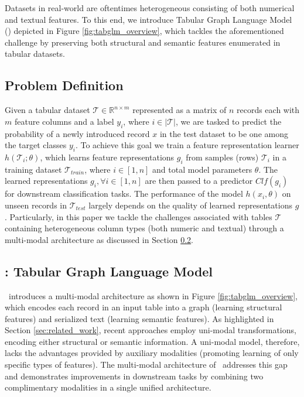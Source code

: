 Datasets in real-world are oftentimes heterogeneous consisting of both numerical and textual features. To this end, we introduce Tabular Graph Language Model (\tabglm) depicted in Figure \ref{fig:tabglm_overview}, which tackles the aforementioned challenge by preserving both structural and semantic features enumerated in tabular datasets.

\subsection{Problem Definition}
\label{sec:problem_definition}
Given a tabular dataset $\mathcal{T} \in \mathbb{R}^{n \times m}$ represented as a matrix of $n$ records each with $m$ feature columns and a label $y_i$, where $i \in |\mathcal{T}|$, we are tasked to predict the probability of a newly introduced record $x$ in the test dataset to be one among the target classes $y_i$.
To achieve this goal we train a feature representation learner $h(\mathcal{T}_i; \theta)$, which learns feature representations $g_i$ from samples (rows) $\mathcal{T}_i$ in a training dataset $\mathcal{T}_{train}$, where $i \in [1, n]$ and total model parameters $\theta$. The learned representations $g_i, \forall i \in [1,n]$ are then passed to a predictor $Clf(g_i)$ for downstream classification tasks. 
The performance of the model $h(x_i, \theta)$ on unseen records in $\mathcal{T}_{test}$ largely depends on the quality of learned representations $g$.
Particularly, in this paper we tackle the challenges associated with tables $\mathcal{T}$ containing heterogeneous column types (both numeric and textual) through a multi-modal architecture as discussed in Section \ref{sec:tabglm}.

\subsection{\tabglm: Tabular Graph Language Model}
\label{sec:tabglm}
\tabglm\ introduces a multi-modal architecture as shown in Figure \ref{fig:tabglm_overview}, which encodes each record in an input table into a graph (learning structural features) and serialized text (learning semantic features).
As highlighted in Section \ref{sec:related_work}, recent approaches employ uni-modal transformations, encoding either structural or semantic information. 
A uni-modal model, therefore, lacks the advantages provided by auxiliary modalities (promoting learning of only specific types of features). The multi-modal architecture of \tabglm\ addresses this gap and demonstrates improvements in downstream tasks by combining two complimentary modalities in a single unified architecture. 

